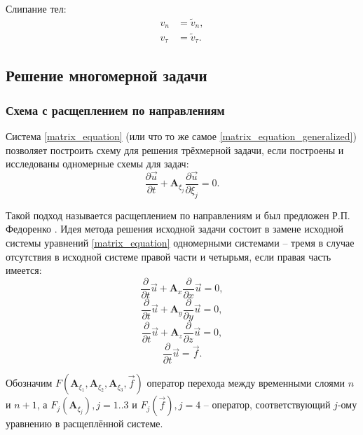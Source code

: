 Слипание тел:
\begin{align}
v_n&=\tilde{v}_n,\nonumber\\
v_\tau&=\tilde{v}_\tau.
\end{align}


\clearpage
\newpage

\subsection{Решение многомерной задачи}

\subsubsection{Схема с расщеплением по направлениям}

Система \eqref{matrix_equation} (или что то же самое \eqref{matrix_equation_generalized}) позволяет построить схему для решения трёхмерной задачи, если построены и исследованы одномерные схемы для задач:
\begin{equation}
\frac{\partial\vec{u}}{\partial{t}} + \mathbf{A}_{\xi_j} \frac{\partial\vec{u}}{\partial{\xi_j}} = 0.
\end{equation}

Такой подход называется расщеплением по направлениям и был предложен Р.П. Федоренко \cite{fedorenko}. Идея метода решения исходной задачи состоит в замене исходной системы уравнений \eqref{matrix_equation} одномерными системами -- тремя в случае отсутствия в исходной системе правой части и четырьмя, если правая часть имеется:
\begin{equation}
\frac{\partial}{\partial t}\vec u+\mathbf{A}_x \frac{\partial}{\partial x}\vec u = 0,
\label{matrix_equation_x}
\end{equation}
\begin{equation}
\frac{\partial}{\partial t}\vec u+\mathbf{A}_y \frac{\partial}{\partial y}\vec u = 0,
\label{matrix_equation_y}
\end{equation}
\begin{equation}
\frac{\partial}{\partial t}\vec u+\mathbf{A}_z \frac{\partial}{\partial z}\vec u = 0,
\label{matrix_equation_z}
\end{equation}
\begin{equation}
\frac{\partial}{\partial t}\vec u = \vec f.
\label{matrix_equation_f}
\end{equation}

Обозначим $F(\mathbf A_{\xi_1}, \mathbf A_{\xi_2}, \mathbf A_{\xi_3}, \vec f)$ оператор перехода между временными слоями $n$ и $n+1$, а $F_j(\mathbf A_{\xi_j}), j=1..3$ и $F_j(\vec f), j=4$ -- оператор, соответствующий $j$-ому уравнению в расщеплённой системе.

